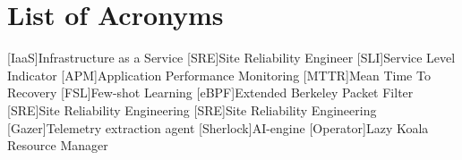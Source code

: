 \chapter*{List of Acronyms}

\begin{acronym}
[IaaS]{Infrastructure as a Service}
[SRE]{Site Reliability Engineer}
[SLI]{Service Level Indicator}
[APM]{Application Performance Monitoring}
[MTTR]{Mean Time To Recovery}
[FSL]{Few-shot Learning}
[eBPF]{Extended Berkeley Packet Filter}
[SRE]{Site Reliability Engineering}
[SRE]{Site Reliability Engineering}
[Gazer]{Telemetry extraction agent}
[Sherlock]{AI-engine}
[Operator]{Lazy Koala Resource Manager}
\end{acronym}